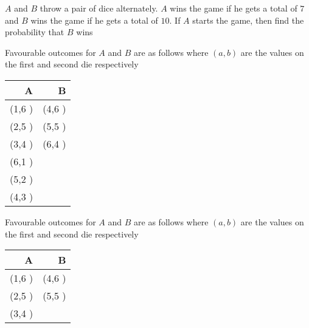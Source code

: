 \documentclass[14pt,fleqn]{extarticle}
\begin{document}
 
\begin{problem}
	\statement 
    
    $A$ and $B$ throw a pair of dice alternately. 
    $A$ wins the game if he gets a total of $7$ and $B$ wins the game if 
    he gets a total of $10$. If $A$ starts the game, then find the 
    probability that $B$ wins

    \begin{step}
  \begin{options} 
     \correct 
      
      Favourable outcomes for $A$ and $B$ are as follows where 
      $\left(a,b \right)$ are the 
      values on the first and second die respectively 
      
      \begin{center}
  \begin{tabular}{NN}
   \toprule
        A & B \\
   \midrule 
   \left(1,6 \right) & \left(4,6 \right) \\
    \midrule 
    \left(2,5 \right) & \left(5,5 \right) \\
    \midrule 
    \left(3,4 \right) & \left(6,4 \right) \\
    \midrule
    \left(6,1 \right) & \\
    \midrule
    \left(5,2 \right) & \\
    \midrule
    \left(4,3 \right) & \\
    \bottomrule
  \end{tabular}
\end{center}

     \incorrect
     
     Favourable outcomes for $A$ and $B$ are as follows where 
      $\left(a,b \right)$ are the 
      values on the first and second die respectively 
      
      \begin{center}
  \begin{tabular}{NN}
   \toprule
        A & B \\
   \midrule 
   \left(1,6 \right) & \left(4,6 \right) \\
    \midrule 
    \left(2,5 \right) & \left(5,5 \right) \\
    \midrule 
    \left(3,4 \right) & \\
    \bottomrule
  \end{tabular}
\end{center}
        
    \end{options} 
     \reason 
     

\end{step}
\end{problem}
\end{document}
